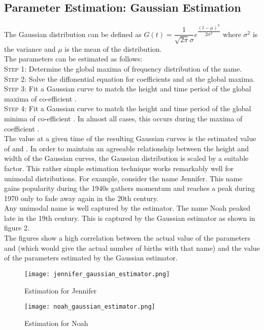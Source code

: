 \documentclass[letterpaper,12pt]{article}
\begin{document}
\subsection{Parameter Estimation: Gaussian Estimation}
The Gaussian distribution can be defined as 
$G(t)=\dfrac{1}{\sqrt{2\pi}\sigma}e^{\dfrac{(t-\mu)^2}{2\sigma^{2}}}$ where $\sigma^{2}$ is the variance and $\mu$ is the mean of the distribution.\\
The parameters can be estimated as follows:\\
\textsc{ Step 1:} Determine the global maxima of frequency distribution of the name. \\
\textsc{ Step 2:} Solve the diffonential equation for coefficients  and  at the global maxima.\\
\textsc{ Step 3:} Fit a Gaussian curve to match the height and time period of the global maxima of co-efficient . \\
\textsc{ Step 4:} Fit a Gaussian curve to match the height and time period of the global minima of co-efficient . In almost all cases, this occurs during the maxima of coefficient .\\
The value at a given time  of the resulting Gaussian curves is the estimated value of  and .
In order to maintain an agreeable relationship between the height and width of the Gaussian curves, the Gaussian distribution is scaled by a suitable factor.
This rather simple estimation technique works remarkably well for unimodal distributions.
For example, consider the name Jennifer. This name gains popularity during the 1940s gathers momentum and reaches a peak during 1970 only to fade away again in the 20th century.\\Any unimodal name is well captured by the estimator. The name Noah peaked late in the 19th century. This is captured by the Gaussian estimator as shown in figure 2.\\
The figures show a high correlation between the actual value of the parameters  and  (which would give the actual number of births with that name) and the value of the parameters estimated by the Gaussian estimator. \\
\begin{figure}[!htb]
\texttt{[image: jennifer\_gaussian\_estimator.png]}
\caption{Estimation for Jennifer}
\end{figure}
\begin{figure}[!htb]
\texttt{[image: noah\_gaussian\_estimator.png]}
\caption{Estimation for Noah}
\end{figure}
\end{document}
